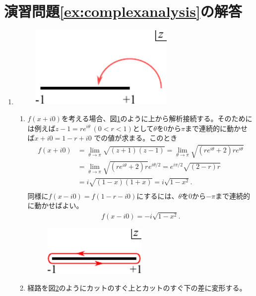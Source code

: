 \documentclass[report,paper=a4, fontsize=12pt, line_length=16cm, number_of_lines=33,dvipdfmx]{jlreq}
\numberwithin{equation}{section}
\begin{document}
\section*{演習問題\ref{ex:complexanalysis}の解答}
\begin{enumerate}
  \item 
  \begin{figure}[htbp]
    \centering
    \includegraphics[width=7cm]{continuation.pdf}
    \caption{}
    \label{continuation}
  \end{figure}
  \begin{enumerate}
  \item $f(x+i0)$を考える場合、図\ref{continuation}のように上から解析接続する。そのためには例えば$z-1=re^{i\theta}\ (0<r<1)$として$\theta$を$0$から$\pi$まで連続的に動かせば$x+i0 = 1-r+i0$ での値が求まる。このとき
  \begin{align*}
    f(x+i0)
    &=\lim_{\theta\to \pi} \sqrt{(z+1)(z-1)}
    =\lim_{\theta\to \pi} \sqrt{(re^{i\theta}+2)re^{i\theta}}\\
    &=\lim_{\theta\to \pi} \sqrt{(re^{i\theta}+2)r}e^{i\theta/2}
    =e^{i\pi/2}\sqrt{(2-r)r}\\
    &=i\sqrt{(1-x)(1+x)}=i\sqrt{1-x^2}.\\
  \end{align*}
  同様に$f(x-i0)=f(1-r-i0)$にするには、$\theta$を$0$から$-\pi$まで連続的に動かせばよい。
  \begin{align}
    f(x-i0)=-i\sqrt{1-x^2}.
  \end{align}
  \begin{figure}[htbp]
    \centering
    \includegraphics[width=5cm]{contour2.pdf}
    \caption{}
    \label{contour2}
  \end{figure}
  \item 経路を図\ref{contour2}のようにカットのすぐ上とカットのすぐ下の差に変形する。

\end{enumerate}
\end{enumerate}
\end{document}
